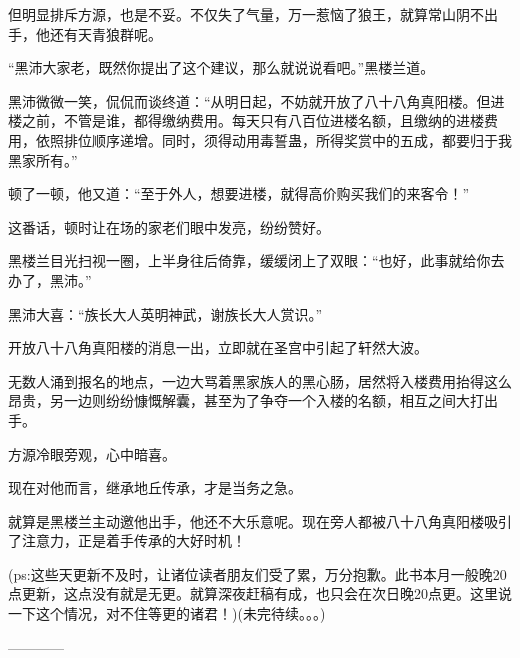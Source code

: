 \begin{this_body}
但明显排斥方源，也是不妥。不仅失了气量，万一惹恼了狼王，就算常山阴不出手，他还有天青狼群呢。

“黑沛大家老，既然你提出了这个建议，那么就说说看吧。”黑楼兰道。

黑沛微微一笑，侃侃而谈终道：“从明日起，不妨就开放了八十八角真阳楼。但进楼之前，不管是谁，都得缴纳费用。每天只有八百位进楼名额，且缴纳的进楼费用，依照排位顺序递增。同时，须得动用毒誓蛊，所得奖赏中的五成，都要归于我黑家所有。”

顿了一顿，他又道：“至于外人，想要进楼，就得高价购买我们的来客令！”

这番话，顿时让在场的家老们眼中发亮，纷纷赞好。

黑楼兰目光扫视一圈，上半身往后倚靠，缓缓闭上了双眼：“也好，此事就给你去办了，黑沛。”

黑沛大喜：“族长大人英明神武，谢族长大人赏识。”

开放八十八角真阳楼的消息一出，立即就在圣宫中引起了轩然大波。

无数人涌到报名的地点，一边大骂着黑家族人的黑心肠，居然将入楼费用抬得这么昂贵，另一边则纷纷慷慨解囊，甚至为了争夺一个入楼的名额，相互之间大打出手。

方源冷眼旁观，心中暗喜。

现在对他而言，继承地丘传承，才是当务之急。

就算是黑楼兰主动邀他出手，他还不大乐意呢。现在旁人都被八十八角真阳楼吸引了注意力，正是着手传承的大好时机！

(ps:这些天更新不及时，让诸位读者朋友们受了累，万分抱歉。此书本月一般晚20点更新，这点没有就是无更。就算深夜赶稿有成，也只会在次日晚20点更。这里说一下这个情况，对不住等更的诸君！)(未完待续。。。)

------------

\end{this_body}

